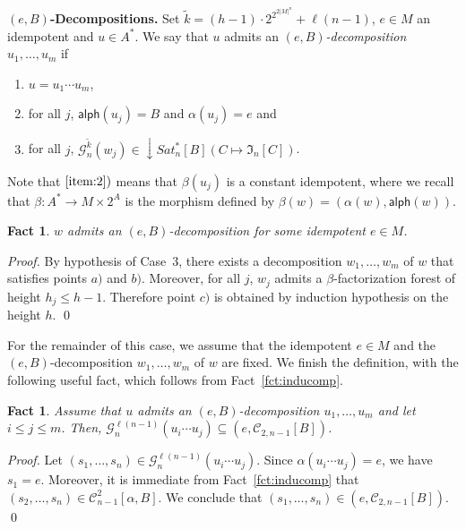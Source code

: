 \documentclass[envcountsame]{llncs}
\newcommand\Cs{\ensuremath{\mathcal{C}}\xspace}
\newcommand\Cstwolen[1]{\ensuremath{\Cs_{2,#1}}\xspace}
\newcommand\Gs{\ensuremath{\mathcal{G}}\xspace}
\let\leq\leqslant
\newcommand\content[1]{\ensuremath{\contentmorphism(#1)}}
\newcommand\contentmorphism{\ensuremath{\textsf{alph}}}
\newcommand\fI{\ensuremath{\mathfrak I}\xspace}
\DeclareMathOperator{\downclos}{\downarrow}
\newtheorem{fact}[theorem]{Fact}
\begin{document}
\medskip
\noindent
{\bf $(e,B)$-Decompositions.} Set $\widetilde{k} = (h-1) \cdot
2^{2^{2|M|^n}} + \ell(n-1)$, $e \in M$ an idempotent and $u \in A^*$. We
say that $u$ admits an \emph{$(e,B)$-decomposition} $u_1,\dots,u_m$
if
\begin{enumerate}[label=$\alph*)$,ref=\alph*]
\item\label{item:1} $u = u_1 \cdots u_m$,
\item\label{item:2} for all $j$, $\content{u_j} = B$ and
  $\alpha(u_j) = e$ and
\item\label{item:3} for all $j$, $\Gs_n^{\widetilde{k}}(w_j) \in \downclos Sat^{*}_n[B](C \mapsto
  \fI_n[C])$.
\end{enumerate}
Note that $\ref{item:2})$ means that $\beta(u_j)$ is a constant idempotent, where we recall that $\beta : A^* \rightarrow M
\times 2^A$ is the morphism defined by $\beta(w) =  (\alpha(w),\content{w})$.

\begin{fact} \label{fct:ebdecomp}
  $w$ admits an $(e,B)$-decomposition for some idempotent $e \in M$.
\end{fact}

\begin{proof}
  By hypothesis of Case~3, there exists a decomposition $w_1,\dots,w_m$
  of $w$ that satisfies points $a)$ and $b)$. Moreover, for all $j$,
  $w_j$ admits a $\beta$-factorization forest of height $h_j \leq
  h-1$. Therefore point $c)$ is obtained by induction hypothesis on the height
  $h$. \qed
\end{proof}

For the remainder of this case, we assume that the idempotent $e \in
M$ and the $(e,B)$-decomposition $w_1,\dots,w_m$ of $w$ are fixed. We
finish the definition, with the following useful fact, which follows
from Fact~\ref{fct:inducomp}.

\begin{fact} \label{fct:correc}
  Assume that $u$ admits an \emph{$(e,B)$-decomposition}
  $u_1,\dots,u_m$ and let $i \leq j \leq m$. Then, $\Gs_n^{\ell(n-1)}(u_{i}
  \cdots u_{j}) \subseteq (e,\Cstwolen{n-1}[B])$.
\end{fact}

\begin{proof}
  Let $(s_1,\dots,s_n) \in \Gs_n^{\ell(n-1)}(u_i\cdots u_j)$. Since $\alpha(u_{i}
  \cdots u_{j}) = e$, we have $s_1 =e$. Moreover, it is immediate from
  Fact~\ref{fct:inducomp} that $(s_2,\dots,s_n) \in
  \Cs_{n-1}^{2}[\alpha,B]$. We conclude that $(s_1,\dots,s_n) \in
  (e,\Cstwolen{n-1}[B])$. \qed
\end{proof}
\end{document}
